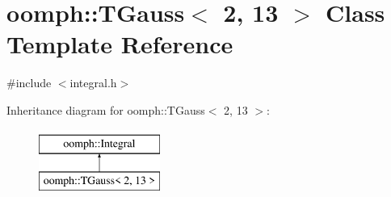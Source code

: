 \hypertarget{classoomph_1_1TGauss_3_012_00_0113_01_4}{}\section{oomph\+:\+:T\+Gauss$<$ 2, 13 $>$ Class Template Reference}
\label{classoomph_1_1TGauss_3_012_00_0113_01_4}


{\ttfamily \#include $<$integral.\+h$>$}

Inheritance diagram for oomph\+:\+:T\+Gauss$<$ 2, 13 $>$\+:\begin{figure}[H]
\begin{center}
\leavevmode
\includegraphics[height=2.000000cm]{classoomph_1_1TGauss_3_012_00_0113_01_4}
\end{center}
\end{figure}
